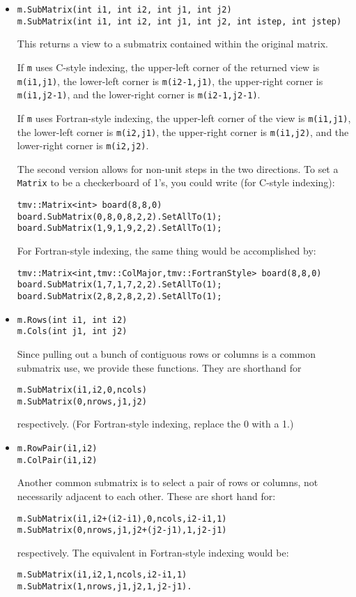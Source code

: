 \documentclass[twoside,letterpaper,11pt]{article}
\renewcommand{\tt}[1]{{\texttt {#1}}}
\begin{document}
\begin{itemize}
\item
\begin{verbatim}
m.SubMatrix(int i1, int i2, int j1, int j2)
m.SubMatrix(int i1, int i2, int j1, int j2, int istep, int jstep)
\end{verbatim}
This returns a view to a submatrix contained within the original matrix.

If \tt{m} uses C-style indexing, 
the upper-left corner of the returned view is \tt{m(i1,j1)},
the lower-left corner is \tt{m(i2-1,j1)},
the upper-right corner is \tt{m(i1,j2-1)}, and
the lower-right corner is \tt{m(i2-1,j2-1)}.

If \tt{m} uses Fortran-style indexing, 
the upper-left corner of the view is \tt{m(i1,j1)},
the lower-left corner is \tt{m(i2,j1)},
the upper-right corner is \tt{m(i1,j2)}, and
the lower-right corner is \tt{m(i2,j2)}.

The second version allows for non-unit steps in the two directions.
To set a \tt{Matrix} to be a checkerboard of 1's, you could write 
(for C-style indexing):
\begin{verbatim}
tmv::Matrix<int> board(8,8,0)
board.SubMatrix(0,8,0,8,2,2).SetAllTo(1);
board.SubMatrix(1,9,1,9,2,2).SetAllTo(1);
\end{verbatim}

For Fortran-style indexing, the same thing would be accomplished by:
\begin{verbatim}
tmv::Matrix<int,tmv::ColMajor,tmv::FortranStyle> board(8,8,0)
board.SubMatrix(1,7,1,7,2,2).SetAllTo(1);
board.SubMatrix(2,8,2,8,2,2).SetAllTo(1);
\end{verbatim}

\item
\begin{verbatim}
m.Rows(int i1, int i2)
m.Cols(int j1, int j2)
\end{verbatim}
Since pulling out a bunch of contiguous rows or columns is a common 
submatrix use, we provide these functions.  They are shorthand for
\begin{verbatim}
m.SubMatrix(i1,i2,0,ncols)
m.SubMatrix(0,nrows,j1,j2)
\end{verbatim}
respectively.  (For Fortran-style indexing, replace the 0 with a 1.)

\item
\begin{verbatim}
m.RowPair(i1,i2)
m.ColPair(i1,i2)
\end{verbatim}
Another common submatrix is to select a pair of rows or columns, not 
necessarily adjacent to each other.  These are short hand for:
\begin{verbatim}
m.SubMatrix(i1,i2+(i2-i1),0,ncols,i2-i1,1)
m.SubMatrix(0,nrows,j1,j2+(j2-j1),1,j2-j1)
\end{verbatim}
respectively.  The equivalent in Fortran-style indexing would be:
\begin{verbatim}
m.SubMatrix(i1,i2,1,ncols,i2-i1,1)
m.SubMatrix(1,nrows,j1,j2,1,j2-j1).
\end{verbatim}


\end{itemize}
\end{document}
